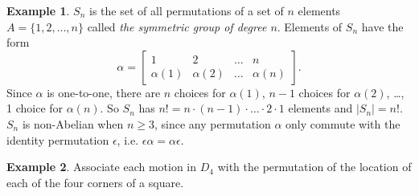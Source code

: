 \documentclass{article}
\theoremstyle{definition}
\newtheorem{example}{Example}[section]
\begin{document}
 \begin{example}
     $S_n$ is the set of all permutations of a set of $n$ elements $A=\{1,2,\dots,n\}$ called \textit{the symmetric group of degree $n$}. Elements of $S_n$ have the form
     \begin{equation*}
         \alpha = 
         \begin{bmatrix}
             1 & 2 & \dots & n \\
             \alpha(1) & \alpha(2) & \dots & \alpha(n)
         \end{bmatrix}.
     \end{equation*}
     Since $\alpha$ is one-to-one, there are $n$ choices for $\alpha(1)$, $n-1$ choices for $\alpha(2)$, \dots, 1 choice for $\alpha(n)$. So $S_n$ has $n!=n\cdot(n-1)\cdot \dots \cdot 2\cdot1$ elements and $|S_n|=n!$. $S_n$ is non-Abelian when $n \geq 3$, since any permutation $\alpha$ only commute with the identity permutation $\epsilon$, i.e. $\epsilon\alpha = \alpha\epsilon$.
 \end{example}
 
 \begin{example}
    Associate each motion in $D_4$ with the permutation of the location of each of the four corners of a square.  
 \end{example}
 
\end{document}

